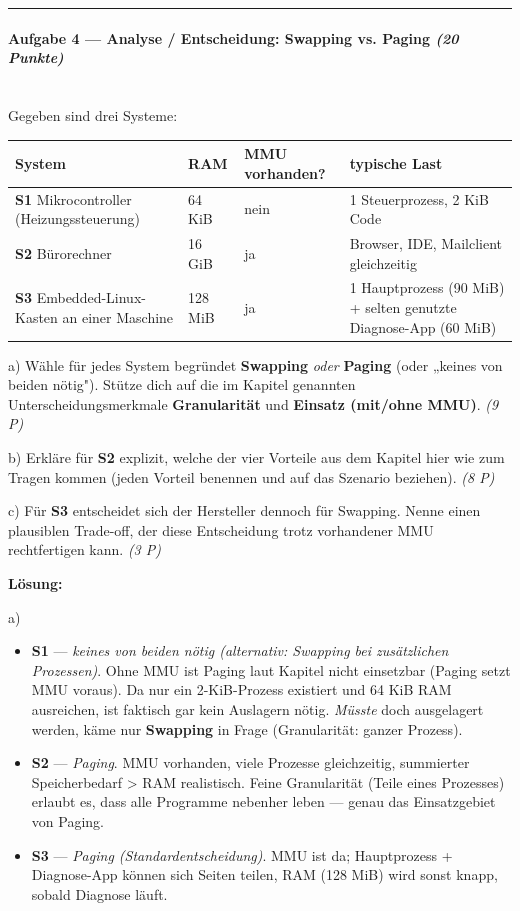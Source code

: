 \documentclass[11pt, a4paper]{article}
\begin{document}
\noindent\textcolor{rulegray}{\rule{\linewidth}{0.4pt}}


\paragraph{Aufgabe 4 — Analyse / Entscheidung: Swapping vs. Paging \textit{(20 Punkte)}}\mbox{}\\[2pt]

Gegeben sind drei Systeme:



{\small
\begin{tabularx}{\linewidth}{XXXX}
\hline
\rowcolor{tableheadbg}
{\color{white}\textbf{System}} & {\color{white}\textbf{RAM}} & {\color{white}\textbf{MMU vorhanden?}} & {\color{white}\textbf{typische Last}} \\[2pt]
\hline
\endhead
\hline
\endfoot
\textbf{S1} Mikrocontroller (Heizungssteuerung) & 64 KiB & nein & 1 Steuerprozess, 2 KiB Code \\
\textbf{S2} Bürorechner & 16 GiB & ja & Browser, IDE, Mailclient gleichzeitig \\
\textbf{S3} Embedded-Linux-Kasten an einer Maschine & 128 MiB & ja & 1 Hauptprozess (90 MiB) + selten genutzte Diagnose-App (60 MiB) \\
\end{tabularx}
}


a) Wähle für jedes System begründet \textbf{Swapping} \textit{oder} \textbf{Paging} (oder „keines von beiden nötig"). Stütze dich auf die im Kapitel genannten Unterscheidungsmerkmale \textbf{Granularität} und \textbf{Einsatz (mit/ohne MMU)}. \textit{(9 P)}


b) Erkläre für \textbf{S2} explizit, welche der vier Vorteile aus dem Kapitel hier wie zum Tragen kommen (jeden Vorteil benennen und auf das Szenario beziehen). \textit{(8 P)}


c) Für \textbf{S3} entscheidet sich der Hersteller dennoch für Swapping. Nenne einen plausiblen Trade-off, der diese Entscheidung trotz vorhandener MMU rechtfertigen kann. \textit{(3 P)}


\textbf{Lösung:}


a)

\begin{itemize}
  \item \textbf{S1} — \textit{keines von beiden nötig (alternativ: Swapping bei zusätzlichen Prozessen)}. Ohne MMU ist Paging laut Kapitel nicht einsetzbar (Paging setzt MMU voraus). Da nur ein 2-KiB-Prozess existiert und 64 KiB RAM ausreichen, ist faktisch gar kein Auslagern nötig. \textit{Müsste} doch ausgelagert werden, käme nur \textbf{Swapping} in Frage (Granularität: ganzer Prozess).
  \item \textbf{S2} — \textit{Paging}. MMU vorhanden, viele Prozesse gleichzeitig, summierter Speicherbedarf > RAM realistisch. Feine Granularität (Teile eines Prozesses) erlaubt es, dass alle Programme nebenher leben — genau das Einsatzgebiet von Paging.
  \item \textbf{S3} — \textit{Paging (Standardentscheidung)}. MMU ist da; Hauptprozess + Diagnose-App können sich Seiten teilen, RAM (128 MiB) wird sonst knapp, sobald Diagnose läuft.
\end{itemize}
\end{document}
